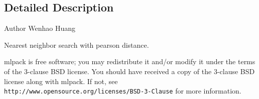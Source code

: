 \subsection{Detailed Description}
\begin{DoxyAuthor}{Author}
Wenhao Huang
\end{DoxyAuthor}
Nearest neighbor search with pearson distance.

mlpack is free software; you may redistribute it and/or modify it under the terms of the 3-\/clause B\+SD license. You should have received a copy of the 3-\/clause B\+SD license along with mlpack. If not, see {\tt http\+://www.\+opensource.\+org/licenses/\+B\+S\+D-\/3-\/\+Clause} for more information. 